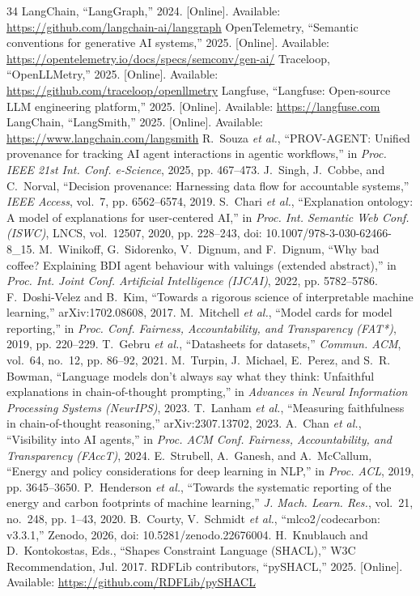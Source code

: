 \documentclass[conference]{IEEEtran}
\begin{document}
\begin{thebibliography}{34}
 LangChain, ``LangGraph,'' 2024. [Online]. Available: \url{https://github.com/langchain-ai/langgraph}
 OpenTelemetry, ``Semantic conventions for generative AI systems,'' 2025. [Online]. Available: \url{https://opentelemetry.io/docs/specs/semconv/gen-ai/}
 Traceloop, ``OpenLLMetry,'' 2025. [Online]. Available: \url{https://github.com/traceloop/openllmetry}
 Langfuse, ``Langfuse: Open-source LLM engineering platform,'' 2025. [Online]. Available: \url{https://langfuse.com}
 LangChain, ``LangSmith,'' 2025. [Online]. Available: \url{https://www.langchain.com/langsmith}
 R.~Souza \emph{et al.}, ``PROV-AGENT: Unified provenance for tracking AI agent interactions in agentic workflows,'' in \emph{Proc. IEEE 21st Int. Conf. e-Science}, 2025, pp. 467--473.
 J.~Singh, J.~Cobbe, and C.~Norval, ``Decision provenance: Harnessing data flow for accountable systems,'' \emph{IEEE Access}, vol.~7, pp. 6562--6574, 2019.
 S.~Chari \emph{et al.}, ``Explanation ontology: A model of explanations for user-centered AI,'' in \emph{Proc. Int. Semantic Web Conf. (ISWC)}, LNCS, vol.~12507, 2020, pp. 228--243, doi: 10.1007/978-3-030-62466-8\_15.
 M.~Winikoff, G.~Sidorenko, V.~Dignum, and F.~Dignum, ``Why bad coffee? Explaining BDI agent behaviour with valuings (extended abstract),'' in \emph{Proc. Int. Joint Conf. Artificial Intelligence (IJCAI)}, 2022, pp. 5782--5786.
 F.~Doshi-Velez and B.~Kim, ``Towards a rigorous science of interpretable machine learning,'' arXiv:1702.08608, 2017.
 M.~Mitchell \emph{et al.}, ``Model cards for model reporting,'' in \emph{Proc. Conf. Fairness, Accountability, and Transparency (FAT*)}, 2019, pp. 220--229.
 T.~Gebru \emph{et al.}, ``Datasheets for datasets,'' \emph{Commun. ACM}, vol.~64, no.~12, pp. 86--92, 2021.
 M.~Turpin, J.~Michael, E.~Perez, and S.~R. Bowman, ``Language models don't always say what they think: Unfaithful explanations in chain-of-thought prompting,'' in \emph{Advances in Neural Information Processing Systems (NeurIPS)}, 2023.
 T.~Lanham \emph{et al.}, ``Measuring faithfulness in chain-of-thought reasoning,'' arXiv:2307.13702, 2023.
 A.~Chan \emph{et al.}, ``Visibility into AI agents,'' in \emph{Proc. ACM Conf. Fairness, Accountability, and Transparency (FAccT)}, 2024.
 E.~Strubell, A.~Ganesh, and A.~McCallum, ``Energy and policy considerations for deep learning in NLP,'' in \emph{Proc. ACL}, 2019, pp. 3645--3650.
 P.~Henderson \emph{et al.}, ``Towards the systematic reporting of the energy and carbon footprints of machine learning,'' \emph{J. Mach. Learn. Res.}, vol.~21, no.~248, pp. 1--43, 2020.
 B.~Courty, V.~Schmidt \emph{et al.}, ``mlco2/codecarbon: v3.3.1,'' Zenodo, 2026, doi: 10.5281/zenodo.22676004.
 H.~Knublauch and D.~Kontokostas, Eds., ``Shapes Constraint Language (SHACL),'' W3C Recommendation, Jul. 2017.
 RDFLib contributors, ``pySHACL,'' 2025. [Online]. Available: \url{https://github.com/RDFLib/pySHACL}
\end{thebibliography}
\end{document}
